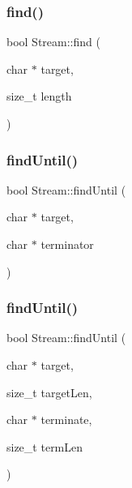 \mbox{\label{class_stream_ad851401f2318cdb1de05707e021b81d9}} 
\subsubsection{\texorpdfstring{find()}{find()}\hspace{0.1cm}{\footnotesize\ttfamily [2/2]}}
{\footnotesize\ttfamily bool Stream\+::find (\begin{DoxyParamCaption}\item[{char $\ast$}]{target,  }\item[{size\+\_\+t}]{length }\end{DoxyParamCaption})}

\mbox{\label{class_stream_ad1f5f6600832396fb38a897baf4de35b}} 
\subsubsection{\texorpdfstring{find\+Until()}{findUntil()}\hspace{0.1cm}{\footnotesize\ttfamily [1/2]}}
{\footnotesize\ttfamily bool Stream\+::find\+Until (\begin{DoxyParamCaption}\item[{char $\ast$}]{target,  }\item[{char $\ast$}]{terminator }\end{DoxyParamCaption})}

\mbox{\label{class_stream_a3a9497de614792103ab8cb4759e01a69}} 
\subsubsection{\texorpdfstring{find\+Until()}{findUntil()}\hspace{0.1cm}{\footnotesize\ttfamily [2/2]}}
{\footnotesize\ttfamily bool Stream\+::find\+Until (\begin{DoxyParamCaption}\item[{char $\ast$}]{target,  }\item[{size\+\_\+t}]{target\+Len,  }\item[{char $\ast$}]{terminate,  }\item[{size\+\_\+t}]{term\+Len }\end{DoxyParamCaption})}

